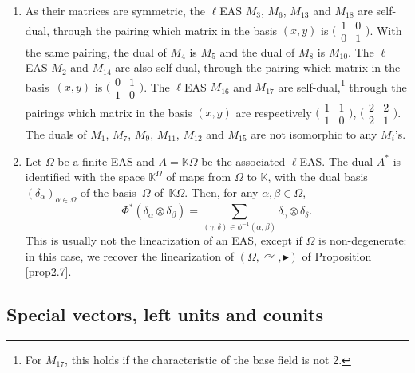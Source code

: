 \documentclass[pdftex]{sigma}
\numberwithin{equation}{section}
\begin{document}
\begin{Example}\quad
\begin{enumerate}\itemsep=0pt
\item[(1)] As their matrices are symmetric, the $\ell$EAS $M_3$, $M_6$, $M_{13}$ and $M_{18}$ are self-dual, through the pairing which matrix in the basis $(x,y)$ is
$\bigl(\begin{smallmatrix}
1&0\\0&1
\end{smallmatrix}\bigr)$.
With the same pairing, the dual of $M_4$ is $M_5$ and the dual of $M_8$ is $M_{10}$. The $\ell$EAS $M_2$ and $M_{14}$ are also self-dual, through the pairing which matrix in the basis~$(x,y)$ is
$\bigl(\begin{smallmatrix}
0&1\\1&0
\end{smallmatrix}\bigr)$.
The $\ell$EAS $M_{16}$ and $M_{17}$ are self-dual,\footnote{For $M_{17}$, this holds if the characteristic of the base field is not 2.} through the pairings which matrix in the basis $(x,y)$ are respectively
$\bigl(\begin{smallmatrix}
1&1\\1&0
\end{smallmatrix}\bigr)$, $\bigl(\begin{smallmatrix}
2&2\\2&1
\end{smallmatrix}\bigr)$.
The duals of $M_1$, $M_7$, $M_9$, $M_{11}$, $M_{12}$ and $M_{15}$ are not isomorphic to any $M_i$'s.
\item[(2)] Let $\Omega$ be a finite EAS and $A=\mathbb{K}\Omega$ be the associated $\ell$EAS. The dual $A^*$ is identified with the space $\mathbb{K}^\Omega$ of maps from $\Omega$ to $\mathbb{K}$, with the dual basis $(\delta_\alpha)_{\alpha \in \Omega}$ of the basis~$\Omega$ of~$\mathbb{K}\Omega$.
Then, for any $\alpha,\beta \in \Omega$,
\[
\Phi^*(\delta_\alpha\otimes \delta_\beta)=\sum_{(\gamma,\delta)\in \phi^{-1}(\alpha,\beta)} \delta_\gamma \otimes \delta_\delta.
\]
This is usually not the linearization of an EAS, except if $\Omega$ is non-degenerate: in this case, we recover the linearization of $(\Omega,\curvearrowright,\blacktriangleright)$ of Proposition \ref{prop2.7}.
\end{enumerate}\end{Example}

\subsection{Special vectors, left units and counits}
\end{document}
